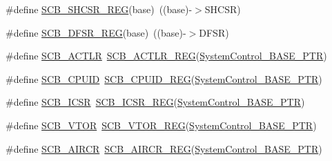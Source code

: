 \begin{DoxyCompactItemize}
\item 
\#define \hyperlink{group___s_c_b___register___accessor___macros_ga0d71167ab5249f469e9325fcde0e9e64}{S\+C\+B\+\_\+\+S\+H\+C\+S\+R\+\_\+\+R\+EG}(base)~((base)-\/$>$S\+H\+C\+SR)
\item 
\#define \hyperlink{group___s_c_b___register___accessor___macros_ga0a463e0b75b661fabeedb3c26e0d240a}{S\+C\+B\+\_\+\+D\+F\+S\+R\+\_\+\+R\+EG}(base)~((base)-\/$>$D\+F\+SR)
\item 
\#define \hyperlink{group___s_c_b___register___accessor___macros_ga2a94c61032c2b326d148f402585f66f4}{S\+C\+B\+\_\+\+A\+C\+T\+LR}~\hyperlink{group___s_c_b___register___accessor___macros_ga8e6ef559a6b8231b4f86185221c7f82a}{S\+C\+B\+\_\+\+A\+C\+T\+L\+R\+\_\+\+R\+EG}(\hyperlink{group___s_c_b___peripheral_gaf22864785770f832103e904244e078cb}{System\+Control\+\_\+\+B\+A\+S\+E\+\_\+\+P\+TR})
\item 
\#define \hyperlink{group___s_c_b___register___accessor___macros_gad6f841a4188701c78b4fbefc4dcd1cb6}{S\+C\+B\+\_\+\+C\+P\+U\+ID}~\hyperlink{group___s_c_b___register___accessor___macros_ga117081636e39f490ee0d6c2dd71994c3}{S\+C\+B\+\_\+\+C\+P\+U\+I\+D\+\_\+\+R\+EG}(\hyperlink{group___s_c_b___peripheral_gaf22864785770f832103e904244e078cb}{System\+Control\+\_\+\+B\+A\+S\+E\+\_\+\+P\+TR})
\item 
\#define \hyperlink{group___s_c_b___register___accessor___macros_ga7f8564488243827944de74c4db24b732}{S\+C\+B\+\_\+\+I\+C\+SR}~\hyperlink{group___s_c_b___register___accessor___macros_gad49675a96aa05153fe6157c5c12667b9}{S\+C\+B\+\_\+\+I\+C\+S\+R\+\_\+\+R\+EG}(\hyperlink{group___s_c_b___peripheral_gaf22864785770f832103e904244e078cb}{System\+Control\+\_\+\+B\+A\+S\+E\+\_\+\+P\+TR})
\item 
\#define \hyperlink{group___s_c_b___register___accessor___macros_ga4b62b78bccb6fe6afabe8f4969f58908}{S\+C\+B\+\_\+\+V\+T\+OR}~\hyperlink{group___s_c_b___register___accessor___macros_ga5f6385eaf8fd7164c6c3c225b6a7d3f4}{S\+C\+B\+\_\+\+V\+T\+O\+R\+\_\+\+R\+EG}(\hyperlink{group___s_c_b___peripheral_gaf22864785770f832103e904244e078cb}{System\+Control\+\_\+\+B\+A\+S\+E\+\_\+\+P\+TR})
\item 
\#define \hyperlink{group___s_c_b___register___accessor___macros_gafb55c4d149b907fe569a1d8bb31cade1}{S\+C\+B\+\_\+\+A\+I\+R\+CR}~\hyperlink{group___s_c_b___register___accessor___macros_ga128fc0df59d5e2b7fc55a6ded49b1586}{S\+C\+B\+\_\+\+A\+I\+R\+C\+R\+\_\+\+R\+EG}(\hyperlink{group___s_c_b___peripheral_gaf22864785770f832103e904244e078cb}{System\+Control\+\_\+\+B\+A\+S\+E\+\_\+\+P\+TR})
\item 

\end{DoxyCompactItemize}
